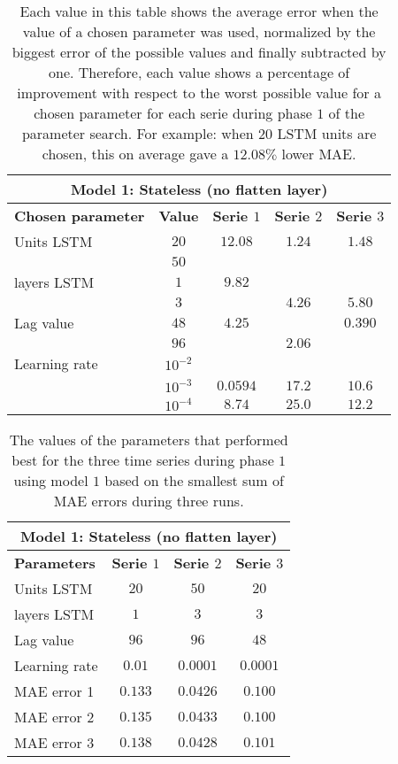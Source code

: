 \begin{table}[ht]
	\centering
	\begin{tabular}{@{}l||c|ccc@{}} \toprule
		\multicolumn{5}{c}{Model 1: Stateless (no flatten layer)}\\\midrule\midrule
		\textbf{Chosen parameter}	& \textbf{Value} & \textbf{Serie $ 1 $} & \textbf{Serie $ 2 $} & \textbf{Serie $ 3 $}\\\midrule
		Units LSTM & $ 20 $ & $12.08 $		&$ 1.24 $  & $1.48 $\\
		 		   & $ 50 $ & 		  		&		   & 		\\\hline
		layers LSTM & $ 1 $ & $9.82 $		&		   & 		\\
				    & $ 3 $ & 	      		&$ 4.26 $  & $5.80$\\\hline
		Lag value & $ 48 $ & $4.25 $ 		&		   & $0.390$\\
				  & $ 96 $ &          		&$ 2.06 $  & 		\\\hline
		Learning rate & $ 10^{-2} $ &       &		   & 		\\
					& $  10^{-3} $ &$0.0594 $&$ 17.2$  & $10.6$\\
					& $  10^{-4} $ &$8.74 $&$ 25.0$    & $12.2$\\\bottomrule
			
	\end{tabular}
	\caption{Each value in this table shows the average error when the value of a chosen parameter was used, normalized by the biggest error of the possible values and finally subtracted by one. Therefore, each value shows a percentage of improvement with respect to the worst possible value for a chosen parameter for each serie during phase $ 1 $ of the parameter search. For example: when $ 20 $ LSTM units are chosen, this on average gave a $ 12.08\% $ lower MAE.}
	\label{tab:relative_performance_parameters_phase_one_model_one}
\end{table}


\begin{table}[ht]
	\centering
	\begin{tabular}{@{}l|ccc@{}} \toprule
		\multicolumn{4}{c}{Model 1: Stateless (no flatten layer)}\\\midrule\midrule
		\textbf{Parameters}	& \textbf{Serie $ 1 $} & \textbf{Serie $ 2 $} & \textbf{Serie $ 3 $}\\\midrule
		Units LSTM & $20 $&$ 50 $  & $20 $\\
		layers LSTM & $1 $&$ 3 $  & $3$\\
		Lag value & $96 $&$ 96$  & $48$\\
		Learning rate & $0.01 $&$ 0.0001$  & $0.0001$\\\hline
		MAE error 1   & $ 0.133 $ & $ 0.0426 $ & $ 0.100 $\\
		MAE error 2   & $ 0.135 $ & $ 0.0433 $ & $ 0.100 $\\
		MAE error 3   & $ 0.138 $ & $ 0.0428 $ & $ 0.101 $\\\bottomrule
	\end{tabular}
	\caption{The values of the parameters that performed best for the three time series during phase $ 1 $ using model $ 1 $ based on the smallest sum of MAE errors during three runs.}
	\label{tab:best_performing_para_phase1}
\end{table}


